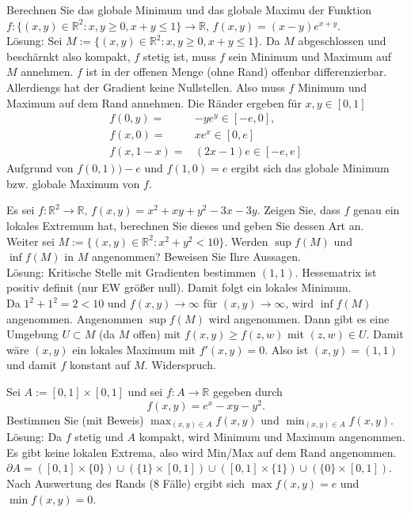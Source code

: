 Berechnen Sie das globale Minimum und das globale Maximu der Funktion $f : \{(x,y) \in \mathbb{R}^2 : x,y \geq 0, x + y \leq 1\} \to \mathbb{R}$, $f(x,y) = (x-y)e^{x+y}$.\\
Lösung:
Sei $M := \{(x,y) \in \mathbb{R}^2 : x,y \geq 0, x + y \leq 1\}$.
Da $M$ abgeschlossen und beschärnkt also kompakt, $f$ stetig ist, muss $f$ sein Minimum und Maximum auf $M$ annehmen.
$f$ ist in der offenen Menge (ohne Rand) offenbar differenzierbar.
Allerdiengs hat der Gradient keine Nullstellen.
Also muss $f$ Minimum und Maximum auf dem Rand annehmen.
Die Ränder ergeben für $x,y \in [0,1]$
\begin{align*}
  f(0,y) =& -ye^y \in [-e,0],\\
  f(x,0) =& xe^x \in [0,e]\\
  f(x,1-x) =& (2x - 1)e \in [-e,e]
\end{align*}
Aufgrund von $f(0,1) ) -e$ und $f(1,0) = e$ ergibt sich das globale Minimum bzw. globale Maximum von $f$.

Es sei $f : \mathbb{R}^2 \to \mathbb{R}$, $f(x,y) = x^2 + xy + y^2 -3x -3y$.
Zeigen Sie, dass $f$ genau ein lokales Extremum hat, berechnen Sie dieses und geben Sie dessen Art an.\\
Weiter sei $M := \{(x,y) \in \mathbb{R}^2 : x^2 + y^2 < 10\}$.
Werden $\sup f(M)$ und $\inf f(M)$ in $M$ angenommen?
Beweisen Sie Ihre Aussagen.\\
Lösung:
Kritische Stelle mit Gradienten bestimmen $(1,1)$.
Hessematrix ist positiv definit (nur EW größer null).
Damit folgt ein lokales Minimum.\\
Da $1^2 + 1^2 = 2 < 10$ und $f(x,y) \to \infty$ für $(x,y) \to \infty$, wird $\inf f(M)$ angenommen.
Angenommen $\sup f(M)$ wird angenommen.
Dann gibt es eine Umgebung $U \subset M$ (da $M$ offen) mit $f(x,y) \geq f(z,w)$ mit $(z,w) \in U$.
Damit wäre $(x,y)$ ein lokales Maximum mit $f'(x,y) = 0$.
Also ist $(x,y) = (1,1)$ und damit $f$ konstant auf $M$.
Widerspruch.

Sei $A := [0,1] \times [0,1]$ und sei $f : A \to \mathbb{R}$ gegeben durch
\begin{displaymath}
  f(x,y) = e^x - xy - y^2.
\end{displaymath}
Bestimmen Sie (mit Beweis) $\max_{(x,y) \in A} f(x,y)$ und $\min_{(x,y) \in A} f(x,y)$.\\
Lösung:
Da $f$ stetig und $A$ kompakt, wird Minimum und Maximum angenommen.
Es gibt keine lokalen Extrema, also wird Min/Max auf dem Rand angenommen.
$\partial A = ([0,1] \times \{0\}) \cup (\{1\} \times [0,1]) \cup ([0,1] \times \{1\}) \cup (\{0\} \times [0,1])$.
Nach Auswertung des Rands (8 Fälle) ergibt sich $\max f(x,y) = e$ und $\min f(x,y) = 0$.

